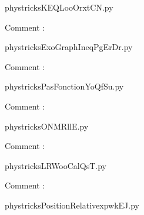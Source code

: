     \newcommand{\CaptionFigKEQLooOrxtCN}{<+Type your caption here+>}
    \begin{center}
        
    \end{center}
    phystricksKEQLooOrxtCN.py

    Comment : 

    \clearpage
    


    \newcommand{\CaptionFigExoGraphIneqPgErDr}{<+Type your caption here+>}
    \begin{center}
        
    \end{center}
    phystricksExoGraphIneqPgErDr.py

    Comment : 

    \clearpage
    


    \newcommand{\CaptionFigPasFonctionYoQfSu}{<+Type your caption here+>}
    \begin{center}
        
    \end{center}
    phystricksPasFonctionYoQfSu.py

    Comment : 

    \clearpage
    


    \newcommand{\CaptionFigONMRllE}{<+Type your caption here+>}
    \begin{center}
        
    \end{center}
    phystricksONMRllE.py

    Comment : 

    \clearpage
    


    \newcommand{\CaptionFigLRWooCalQsT}{<+Type your caption here+>}
    \begin{center}
        
    \end{center}
    phystricksLRWooCalQsT.py

    Comment : 

    \clearpage
    


    \newcommand{\CaptionFigPositionRelativexpwkEJ}{<+Type your caption here+>}
    \begin{center}
        
    \end{center}
    phystricksPositionRelativexpwkEJ.py

